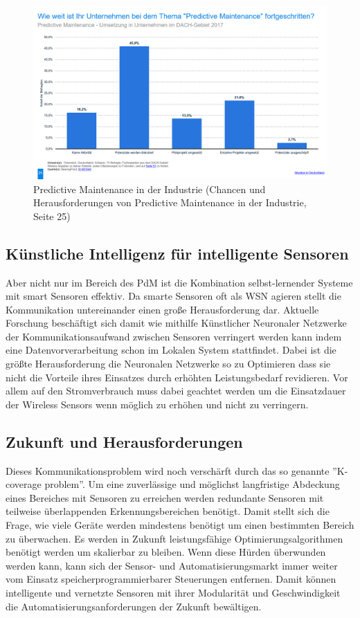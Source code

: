 \documentclass[a4paper,12pt]{scrartcl}
\begin{document}
\begin{figure}[H]
\centering
\includegraphics[scale=0.45]{picture/PM}
\caption{Predictive Maintenance in der Industrie (Chancen und Herausforderungen von Predictive Maintenance in der Industrie, Seite 25)}
\label{fig:Smart Factory - Genutzte Technologien in Deutschland 2017}
\end{figure}

\subsection{Künstliche Intelligenz für intelligente Sensoren}
Aber nicht nur im Bereich des PdM ist die Kombination selbst-lernender Systeme mit smart Sensoren effektiv. Da smarte Sensoren oft als WSN agieren stellt die Kommunikation untereinander einen große Herausforderung dar. Aktuelle Forschung beschäftigt sich damit wie mithilfe Künstlicher Neuronaler Netzwerke der Kommunikationsaufwand zwischen Sensoren verringert werden kann indem eine Datenvorverarbeitung schon im Lokalen System stattfindet. Dabei ist die größte Herausforderung die Neuronalen Netzwerke so zu Optimieren dass sie nicht die Vorteile ihres Einsatzes durch erhöhten Leistungsbedarf revidieren. Vor allem auf den Stromverbrauch muss dabei geachtet werden um die Einsatzdauer der Wireless Sensors wenn möglich zu erhöhen und nicht zu verringern.

\cite[Seite 3 ff.]{Talaska.2018}   
\newpage
\subsection{Zukunft und Herausforderungen}
Dieses Kommunikationsproblem wird noch verschärft durch das so genannte ''K-coverage problem''. Um eine zuverlässige und möglichst langfristige Abdeckung eines Bereiches mit Sensoren zu erreichen werden redundante Sensoren mit teilweise überlappenden Erkennungsbereichen benötigt. Damit stellt sich die Frage, wie viele Geräte werden mindestens benötigt um einen bestimmten Bereich zu überwachen. Es werden in Zukunft leistungsfähige Optimierungsalgorithmen benötigt werden um skalierbar zu bleiben. 
Wenn diese Hürden überwunden werden kann, kann sich der Sensor- und Automatisierungsmarkt immer weiter vom Einsatz speicherprogrammierbarer Steuerungen entfernen. Damit können intelligente und vernetzte Sensoren mit ihrer Modularität und Geschwindigkeit die Automatisierungsanforderungen der Zukunft bewältigen.
\end{document}
